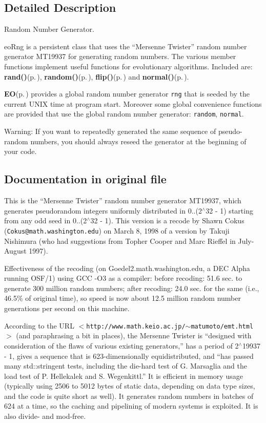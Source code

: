 \subsection{Detailed Description}
Random Number Generator. 

eo\-Rng is a persistent class that uses the ``Mersenne Twister'' random number generator MT19937 for generating random numbers. The various member functions implement useful functions for evolutionary algorithms. Included are: {\bf rand()}{\rm (p.\,\pageref{classeo_rng_a11})}, {\bf random()}{\rm (p.\,\pageref{classeo_rng_a5})}, {\bf flip()}{\rm (p.\,\pageref{classeo_rng_a6})} and {\bf normal()}{\rm (p.\,\pageref{classeo_rng_a7})}.

{\bf EO}{\rm (p.\,\pageref{class_e_o})} provides a global random number generator {\tt rng} that is seeded by the current UNIX time at program start. Moreover some global convenience functions are provided that use the global random number generator: {\tt random}, {\tt normal}.

\begin{Desc}
\item[Warning:]If you want to repeatedly generated the same sequence of pseudo-random numbers, you should always reseed the generator at the beginning of your code.\end{Desc}
\subsection*{Documentation in original file}

This is the ``Mersenne Twister'' random number generator MT19937, which generates pseudorandom integers uniformly distributed in 0..(2$^\wedge$32 - 1) starting from any odd seed in 0..(2$^\wedge$32 - 1). This version is a recode by Shawn Cokus ({\tt Cokus@math.washington.edu}) on March 8, 1998 of a version by Takuji Nishimura (who had suggestions from Topher Cooper and Marc Rieffel in July-August 1997).

Effectiveness of the recoding (on Goedel2.math.washington.edu, a DEC Alpha running OSF/1) using GCC -O3 as a compiler: before recoding: 51.6 sec. to generate 300 million random numbers; after recoding: 24.0 sec. for the same (i.e., 46.5\% of original time), so speed is now about 12.5 million random number generations per second on this machine.

According to the URL $<${\tt http://www.math.keio.ac.jp/$\sim$matumoto/emt.html}$>$ (and paraphrasing a bit in places), the Mersenne Twister is ``designed with consideration of the flaws of various existing generators,'' has a period of 2$^\wedge$19937 - 1, gives a sequence that is 623-dimensionally equidistributed, and ``has passed many std::stringent tests, including the die-hard test of G. Marsaglia and the load test of P. Hellekalek and S. Wegenkittl.'' It is efficient in memory usage (typically using 2506 to 5012 bytes of static data, depending on data type sizes, and the code is quite short as well). It generates random numbers in batches of 624 at a time, so the caching and pipelining of modern systems is exploited. It is also divide- and mod-free.

